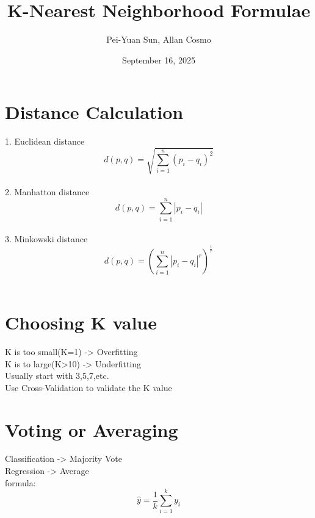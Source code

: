 \documentclass{article}
\title{K-Nearest Neighborhood Formulae}
\author{Pei-Yuan Sun, Allan Cosmo}
\date{September 16, 2025}
\begin{document}
   \maketitle
   \section{Distance Calculation}
      1. Euclidean distance
         $$d(p,q)=\sqrt{\sum^{n}_{i=1}(p_{i}-q_{i})^2}$$\\
      2. Manhatton distance
         $$d(p,q)=\sum^{n}_{i=1}|p_{i}-q_{i}|$$\\
      3. Minkowski distance
         $$d(p,q)=\left(\sum^{n}_{i=1}|p_{i}-q_{i}|^r\right)^\frac{1}{r}$$\\
   \section{Choosing K value}
      K is too small(K=1) -> Overfitting\\
      K is to large(K>10) -> Underfitting\\
      Usually start with 3,5,7,etc.\\
      Use Cross-Validation to validate the K value\\
    \section{Voting or Averaging}
       Classification -> Majority Vote\\
       Regression -> Average\\
       formula: 
       $$\hat{y}=\frac{1}{k}\sum^{k}_{i=1}y_{i}$$
\end{document}
